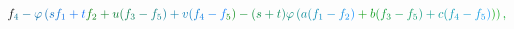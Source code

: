 \documentclass[12pt]{article}
\begin{document}
\begin{displaymath}
{f} _ { \mathcolor[RGB]{0,105,135}{4} } \mathcolor[RGB]{0,105,150}{-} \mathcolor[RGB]{0,105,165}{\varphi} \mathcolor[RGB]{0,105,180}{\left(} \mathcolor[RGB]{0,105,195}{s} \mathcolor[RGB]{0,105,210}{f} _ { \mathcolor[RGB]{0,105,225}{1} } \mathcolor[RGB]{0,105,240}{+} \mathcolor[RGB]{0,105,255}{t} \mathcolor[RGB]{0,120,0}{f} _ { \mathcolor[RGB]{0,120,15}{2} } \mathcolor[RGB]{0,120,30}{+} \mathcolor[RGB]{0,120,45}{u} \mathcolor[RGB]{0,120,60}{(} \mathcolor[RGB]{0,120,75}{f} _ { \mathcolor[RGB]{0,120,90}{3} } \mathcolor[RGB]{0,120,105}{-} \mathcolor[RGB]{0,120,120}{f} _ { \mathcolor[RGB]{0,120,135}{5} } \mathcolor[RGB]{0,120,150}{)} \mathcolor[RGB]{0,120,165}{+} \mathcolor[RGB]{0,120,180}{v} \mathcolor[RGB]{0,120,195}{(} \mathcolor[RGB]{0,120,210}{f} _ { \mathcolor[RGB]{0,120,225}{4} } \mathcolor[RGB]{0,120,240}{-} \mathcolor[RGB]{0,120,255}{f} _ { \mathcolor[RGB]{0,135,0}{5} } \mathcolor[RGB]{0,135,15}{)} \mathcolor[RGB]{0,135,30}{-} \mathcolor[RGB]{0,135,45}{(} \mathcolor[RGB]{0,135,60}{s} \mathcolor[RGB]{0,135,75}{+} \mathcolor[RGB]{0,135,90}{t} \mathcolor[RGB]{0,135,105}{)} \mathcolor[RGB]{0,135,120}{\varphi} \mathcolor[RGB]{0,135,135}{\left(} \mathcolor[RGB]{0,135,150}{a} \mathcolor[RGB]{0,135,165}{(} \mathcolor[RGB]{0,135,180}{f} _ { \mathcolor[RGB]{0,135,195}{1} } \mathcolor[RGB]{0,135,210}{-} \mathcolor[RGB]{0,135,225}{f} _ { \mathcolor[RGB]{0,135,240}{2} } \mathcolor[RGB]{0,135,255}{)} \mathcolor[RGB]{0,150,0}{+} \mathcolor[RGB]{0,150,15}{b} \mathcolor[RGB]{0,150,30}{(} \mathcolor[RGB]{0,150,45}{f} _ { \mathcolor[RGB]{0,150,60}{3} } \mathcolor[RGB]{0,150,75}{-} \mathcolor[RGB]{0,150,90}{f} _ { \mathcolor[RGB]{0,150,105}{5} } \mathcolor[RGB]{0,150,120}{)} \mathcolor[RGB]{0,150,135}{+} \mathcolor[RGB]{0,150,150}{c} \mathcolor[RGB]{0,150,165}{(} \mathcolor[RGB]{0,150,180}{f} _ { \mathcolor[RGB]{0,150,195}{4} } \mathcolor[RGB]{0,150,210}{-} \mathcolor[RGB]{0,150,225}{f} _ { \mathcolor[RGB]{0,150,240}{5} } \mathcolor[RGB]{0,150,255}{)} \mathcolor[RGB]{0,165,0}{\right)} \mathcolor[RGB]{0,165,15}{\right)} \mathcolor[RGB]{0,165,30}{,} \,
\end{displaymath}
\end{document}
